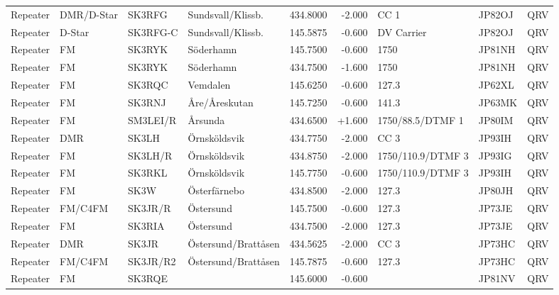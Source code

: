 \begin{landscape}
\begin{longtable}{llllrrlll}
	Repeater & DMR/D-Star      & SK3RFG   & Sundsvall/Klissb.     &     434.8000 &     -2.000 & CC 1               & JP82OJ      & QRV      \\
	Repeater & D-Star          & SK3RFG-C & Sundsvall/Klissb.     &     145.5875 &     -0.600 & DV Carrier         & JP82OJ      & QRV      \\
	Repeater & FM              & SK3RYK   & Söderhamn             &     145.7500 &     -0.600 & 1750               & JP81NH      & QRV      \\
	Repeater & FM              & SK3RYK   & Söderhamn             &     434.7500 &     -1.600 & 1750               & JP81NH      & QRV      \\
	Repeater & FM              & SK3RQC   & Vemdalen              &     145.6250 &     -0.600 & 127.3              & JP62XL      & QRV      \\
	Repeater & FM              & SK3RNJ   & Åre/Åreskutan         &     145.7250 &     -0.600 & 141.3              & JP63MK      & QRV      \\
	Repeater & FM              & SM3LEI/R & Årsunda               &     434.6500 &     +1.600 & 1750/88.5/DTMF 1   & JP80IM      & QRV      \\
	Repeater & DMR             & SK3LH    & Örnsköldsvik          &     434.7750 &     -2.000 & CC 3               & JP93IH      & QRV      \\
	Repeater & FM              & SK3LH/R  & Örnsköldsvik          &     434.8750 &     -2.000 & 1750/110.9/DTMF 3  & JP93IG      & QRV      \\
	Repeater & FM              & SK3RKL   & Örnsköldsvik          &     145.7750 &     -0.600 & 1750/110.9/DTMF 3  & JP93IH      & QRV      \\
	Repeater & FM              & SK3W     & Österfärnebo          &     434.8500 &     -2.000 & 127.3              & JP80JH      & QRV      \\
	Repeater & FM/C4FM         & SK3JR/R  & Östersund             &     145.7500 &     -0.600 & 127.3              & JP73JE      & QRV      \\
	Repeater & FM              & SK3RIA   & Östersund             &     434.7500 &     -2.000 & 127.3              & JP73JE      & QRV      \\
	Repeater & DMR             & SK3JR    & Östersund/Brattåsen   &     434.5625 &     -2.000 & CC 3               & JP73HC      & QRV      \\
	Repeater & FM/C4FM         & SK3JR/R2 & Östersund/Brattåsen   &     145.7875 &     -0.600 & 127.3              & JP73HC      & QRV      \\
	Repeater & FM              & SK3RQE   &                       &     145.6000 &     -0.600 &                    & JP81NV      & QRV     
\end{longtable}



\end{landscape}
